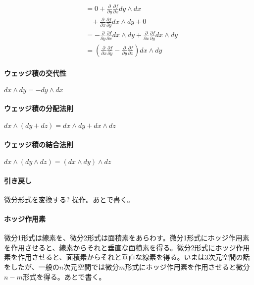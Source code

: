 \begin{equation*}
\begin{split}
&= 0 + \frac{\partial}{\partial y} \frac{\partial f}{\partial x} dy \wedge dx \\
& \; \; \; + \frac{\partial}{\partial x} \frac{\partial f}{\partial y} dx \wedge dy + 0 \\
&= - \frac{\partial}{\partial y} \frac{\partial f}{\partial x} dx \wedge dy + \frac{\partial}{\partial x} \frac{\partial f}{\partial y} dx \wedge dy \\
&= ( \frac{\partial}{\partial x} \frac{\partial f}{\partial y} - \frac{\partial}{\partial y} \frac{\partial f}{\partial x} ) dx \wedge dy
\end{split}
\end{equation*}

\paragraph{ウェッジ積の交代性}

$ d x \wedge d y = - d y \wedge d x $

\paragraph{ウェッジ積の分配法則}

$ d x \wedge ( d y + d z ) = d x \wedge d y + d x \wedge d z $

\paragraph{ウェッジ積の結合法則}

$ d x \wedge (d y \wedge d z) = (d x \wedge d y) \wedge d z $

\paragraph{引き戻し}

微分形式を変換する? 操作。あとで書く。

\paragraph{ホッジ作用素}

微分1形式は線素を、微分2形式は面積素をあらわす。微分1形式にホッジ作用素を作用させると、線素からそれと垂直な面積素を得る。微分2形式にホッジ作用素を作用させると、面積素からそれと垂直な線素を得る。いまは3次元空間の話をしたが、一般の$n$次元空間では微分$m$形式にホッジ作用素を作用させると微分$n-m$形式を得る。あとで書く。

